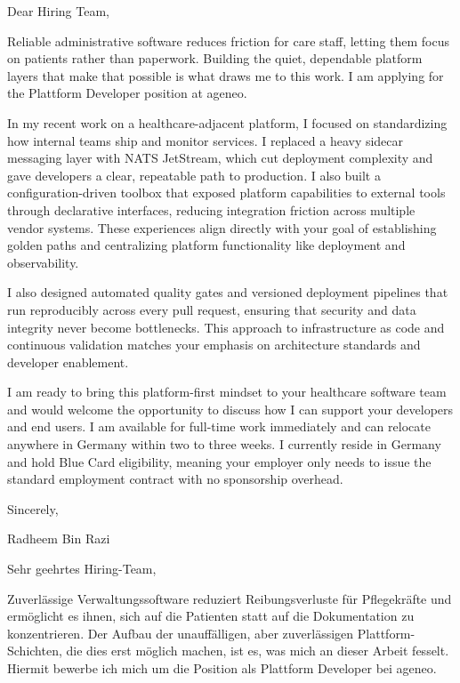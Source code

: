 \documentclass[11pt,a4paper]{coverletter}
\begin{document}

\opening{Dear Hiring Team,}

Reliable administrative software reduces friction for care staff, letting them focus on patients rather than paperwork. Building the quiet, dependable platform layers that make that possible is what draws me to this work. I am applying for the Plattform Developer position at ageneo.

In my recent work on a healthcare-adjacent platform, I focused on standardizing how internal teams ship and monitor services. I replaced a heavy sidecar messaging layer with NATS JetStream, which cut deployment complexity and gave developers a clear, repeatable path to production. I also built a configuration-driven toolbox that exposed platform capabilities to external tools through declarative interfaces, reducing integration friction across multiple vendor systems. These experiences align directly with your goal of establishing golden paths and centralizing platform functionality like deployment and observability.

I also designed automated quality gates and versioned deployment pipelines that run reproducibly across every pull request, ensuring that security and data integrity never become bottlenecks. This approach to infrastructure as code and continuous validation matches your emphasis on architecture standards and developer enablement.

I am ready to bring this platform-first mindset to your healthcare software team and would welcome the opportunity to discuss how I can support your developers and end users. I am available for full-time work immediately and can relocate anywhere in Germany within two to three weeks. I currently reside in Germany and hold Blue Card eligibility, meaning your employer only needs to issue the standard employment contract with no sponsorship overhead.

\closing{Sincerely,}{Radheem Bin Razi}

\clearpage
{}


\opening{Sehr geehrtes Hiring-Team,}

Zuverlässige Verwaltungssoftware reduziert Reibungsverluste für Pflegekräfte und ermöglicht es ihnen, sich auf die Patienten statt auf die Dokumentation zu konzentrieren. Der Aufbau der unauffälligen, aber zuverlässigen Plattform-Schichten, die dies erst möglich machen, ist es, was mich an dieser Arbeit fesselt. Hiermit bewerbe ich mich um die Position als Plattform Developer bei ageneo.
\end{document}
